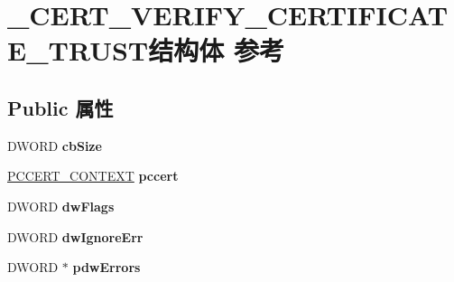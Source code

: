 \hypertarget{struct___c_e_r_t___v_e_r_i_f_y___c_e_r_t_i_f_i_c_a_t_e___t_r_u_s_t}{}\section{\+\_\+\+C\+E\+R\+T\+\_\+\+V\+E\+R\+I\+F\+Y\+\_\+\+C\+E\+R\+T\+I\+F\+I\+C\+A\+T\+E\+\_\+\+T\+R\+U\+S\+T结构体 参考}
\label{struct___c_e_r_t___v_e_r_i_f_y___c_e_r_t_i_f_i_c_a_t_e___t_r_u_s_t}
\subsection*{Public 属性}
\begin{DoxyCompactItemize}
\item 
\mbox{\label{struct___c_e_r_t___v_e_r_i_f_y___c_e_r_t_i_f_i_c_a_t_e___t_r_u_s_t_ad19563e682c0f90d750f9b00b9edc189}} 
D\+W\+O\+RD {\bfseries cb\+Size}
\item 
\mbox{\label{struct___c_e_r_t___v_e_r_i_f_y___c_e_r_t_i_f_i_c_a_t_e___t_r_u_s_t_aa8a48a63c979be0fd737e3b14a780f8b}} 
\hyperlink{struct___c_e_r_t___c_o_n_t_e_x_t}{P\+C\+C\+E\+R\+T\+\_\+\+C\+O\+N\+T\+E\+XT} {\bfseries pccert}
\item 
\mbox{\label{struct___c_e_r_t___v_e_r_i_f_y___c_e_r_t_i_f_i_c_a_t_e___t_r_u_s_t_a3018cf8973a8806d14f1aaa023b830af}} 
D\+W\+O\+RD {\bfseries dw\+Flags}
\item 
\mbox{\label{struct___c_e_r_t___v_e_r_i_f_y___c_e_r_t_i_f_i_c_a_t_e___t_r_u_s_t_a32c424db9d85358adfabcb512a6b2962}} 
D\+W\+O\+RD {\bfseries dw\+Ignore\+Err}
\item 
\mbox{\label{struct___c_e_r_t___v_e_r_i_f_y___c_e_r_t_i_f_i_c_a_t_e___t_r_u_s_t_a858abaed3f0921e3e752e0f763af8eca}} 
D\+W\+O\+RD $\ast$ {\bfseries pdw\+Errors}
\item 
\mbox{\label{struct___c_e_r_t___v_e_r_i_f_y___c_e_r_t_i_f_i_c_a_t_e___t_r_u_s_t_a2c3c5d5765083ceb53bee69fd47de781}} 

\end{DoxyCompactItemize}
